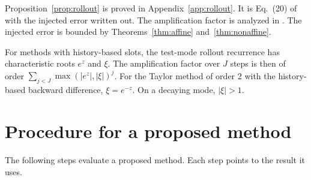 \documentclass[11pt]{article}
\theoremstyle{definition}
\theoremstyle{remark}
\begin{document}
Proposition~\ref{prop:rollout} is proved in Appendix~\ref{app:rollout}.
It is Eq.~(20) of \cite{ainslie2026} with the injected error written out.
The amplification factor is analyzed in \cite{ainslie2026}.
The injected error is bounded by Theorems~\ref{thm:affine} and~\ref{thm:nonaffine}.

For methods with history-based slots, the test-mode rollout recurrence has characteristic roots $e^z$ and $\xi$.
The amplification factor over $J$ steps is then of order $\sum_{j<J} \max(|e^z|, |\xi|)^j$.
For the Taylor method of order 2 with the history-based backward difference, $\xi = e^{-z}$.
On a decaying mode, $|\xi| > 1$.

\section{Procedure for a proposed method}\label{sec:procedure}

The following steps evaluate a proposed method.
Each step points to the result it uses.
\end{document}
